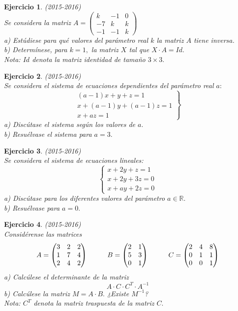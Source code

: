 \documentclass[12pt, a4paper]{amsart}
\newtheorem{ejer}{Ejercicio}
\begin{document}
\begin{ejer}\em (2015-2016)\\
Se considera la matriz $A=\begin{pmatrix}
k & -1 & 0
\\ -7 & k & k
\\ -1 & -1 & k\end{pmatrix}$\\
a) Estúdiese para qué valores del parámetro real $k$ la matriz $A$ tiene inversa.\\
b) Determínese, para $k = 1,$ la matriz $X$ tal que $X\cdot A = Id.$\\
Nota: $Id$ denota la matriz identidad de tamaño $3 \times 3.$
\end{ejer}

\begin{ejer}\em (2015-2016)\\
Se considera el sistema de ecuaciones dependientes del parámetro real $a:$
\[
\left. \begin{matrix}
(a-1)x+y+z=1
\\ x+(a-1)y+(a-1)z=1
\\ x+az=1
\end{matrix}  \right \}
\]
a) Discútase el sistema según los valores de $a.$\\
b) Resuélvase el sistema para $a = 3.$
\end{ejer}

\begin{ejer}\em (2015-2016)\\
Se considera el sistema de ecuaciones lineales:
\[
\left \{ \begin{matrix}
x+2y+z=1
\\x+2y+3z=0
\\ x+ay+2z=0
\end{matrix}\right.
\]
a) Discútase para los diferentes valores del parámetro $a\in\mathbb{R}.$\\
b) Resuélvase para $a = 0.$
\end{ejer}

\begin{ejer}\em (2015-2016)\\
Considérense las matrices
\[
A=\begin{pmatrix}
3 & 2 & 2
\\ 1 & 7 & 4
\\ 2 & 4 & 2
\end{pmatrix} \hspace*{1cm} B=\begin{pmatrix}
2 & 1
\\ 5 & 3
\\0 & 1
\end{pmatrix} \hspace*{1cm} C=\begin{pmatrix}
2 & 4 & 8
\\ 0 & 1 & 1
\\0 & 0 & 1
\end{pmatrix}
\]
a) Calcúlese el determinante de la matriz
\[
A\cdot C \cdot C^T\cdot A^{-1}
\]
b) Calcúlese la matriz $M = A \cdot B.$ ¿Existe $M^{-1}$?\\
Nota: $C^T$ denota la matriz traspuesta de la matriz $C.$
\end{ejer}
\end{document}
